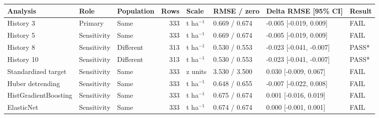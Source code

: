 \begin{tabular}{lllrllll}
\toprule
Analysis & Role & Population & Rows & Scale & RMSE / zero & Delta RMSE [95\% CI] & Result \\
\midrule
History 3 & Primary & Same & 333 & t ha$^{-1}$ & 0.669 / 0.674 & -0.005 [-0.019, 0.009] & FAIL \\
History 5 & Sensitivity & Same & 333 & t ha$^{-1}$ & 0.669 / 0.674 & -0.005 [-0.019, 0.009] & FAIL \\
History 8 & Sensitivity & Different & 313 & t ha$^{-1}$ & 0.530 / 0.553 & -0.023 [-0.041, -0.007] & PASS* \\
History 10 & Sensitivity & Different & 313 & t ha$^{-1}$ & 0.530 / 0.553 & -0.023 [-0.041, -0.007] & PASS* \\
Standardized target & Sensitivity & Same & 333 & z units & 3.530 / 3.500 & 0.030 [-0.009, 0.067] & FAIL \\
Huber detrending & Sensitivity & Same & 333 & t ha$^{-1}$ & 0.648 / 0.655 & -0.007 [-0.022, 0.008] & FAIL \\
HistGradientBoosting & Sensitivity & Same & 333 & t ha$^{-1}$ & 0.675 / 0.674 & 0.001 [-0.016, 0.019] & FAIL \\
ElasticNet & Sensitivity & Same & 333 & t ha$^{-1}$ & 0.674 / 0.674 & 0.000 [-0.001, 0.001] & FAIL \\
\bottomrule
\end{tabular}
